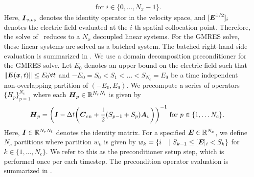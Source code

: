 \begin{itemize}
\begin{multline}
	\text{ for } i \in \{0,\hdots, N_x - 1\} \label{eq:vspace_batched_system}.
\end{multline} Here, $\boldsymbol{I}_{v,{v_{\theta}}}$ denotes the identity operator in the velocity space, and $[\boldsymbol{E}^{1/2}]_i$ denotes the electric field evaluated at the $i$-th spatial collocation point. Therefore, the solve of~ reduces to a $N_x$ decoupled linear systems. For the GMRES solve, these linear systems are solved as a batched system. The batched right-hand side evaluation is summarized in . We use a domain decomposition preconditioner for the GMRES solve. Let $E_0$ denotes an upper bound on the electric field such that $\norm{\vect{E}\of{\vect x, t}} \leq E_0 \forall t$ and $-E_0 = S_0 < S_1 < \hdots < S_{N_c}=E_0$ be a time independent non-overlapping partition of $(-E_0, E_0)$. We precompute a series of operators $\{H_p\}_{p=1}^{N_c}$ where each $\boldsymbol{H}_p\in \mathbb{R}^{N_r N_l}$ is given by
\begin{equation}
	\vect H_p = \of{\vect I -\Delta t \of {\vect C_{en} + \frac{1}{2}\of{S_{p-1} + S_{p}} \vect A_v}}^{-1} 
	\text{ for } p\in\{1,\hdots N_c\}.
\end{equation} Here, $\boldsymbol{I}\in \mathbb{R}^{N_r N_l}$ denotes the identity matrix. For a specified $\boldsymbol{E} \in \mathbb{R}^{N_x}$, we define $N_c$ partitions where partition $w_k$ is given by $w_k=\{i\quad | \  S_{k-1} \leq [\boldsymbol{E}]_i < S_{k}\}$ for $k\in \{1,\hdots,N_c\}$. We refer to this as the preconditioner setup step, which is performed once per each timestep. The precondition operator evaluation is summarized in .
\end{itemize}

